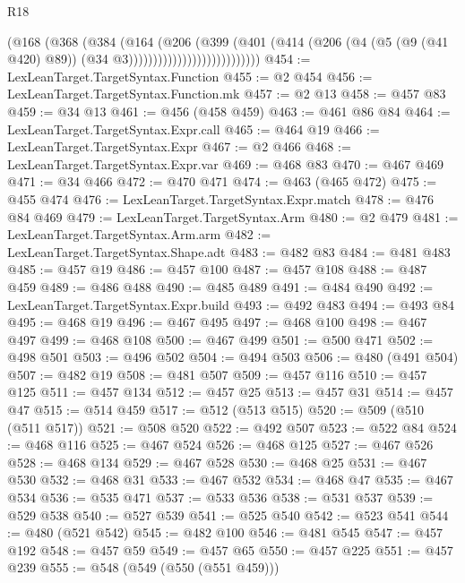 \begin{lexlean}{R18}
\begin{coremodule}
                                    (@168
                                      (@368
                                        (@384
                                          (@164
                                            (@206
                                              (@399
                                                (@401
                                                  (@414
                                                    (@206
                                                      (@4
                                                        (@5 (@9 (@41 @420) @89))
                                                        (@34 @3)))))))))))))))))))))))))))
@454 := LexLeanTarget.TargetSyntax.Function
@455 := @2 @454
@456 := LexLeanTarget.TargetSyntax.Function.mk
@457 := @2 @13
@458 := @457 @83
@459 := @34 @13
@461 := @456 (@458 @459)
@463 := @461 @86 @84
@464 := LexLeanTarget.TargetSyntax.Expr.call
@465 := @464 @19
@466 := LexLeanTarget.TargetSyntax.Expr
@467 := @2 @466
@468 := LexLeanTarget.TargetSyntax.Expr.var
@469 := @468 @83
@470 := @467 @469
@471 := @34 @466
@472 := @470 @471
@474 := @463 (@465 @472)
@475 := @455 @474
@476 := LexLeanTarget.TargetSyntax.Expr.match
@478 := @476 @84 @469
@479 := LexLeanTarget.TargetSyntax.Arm
@480 := @2 @479
@481 := LexLeanTarget.TargetSyntax.Arm.arm
@482 := LexLeanTarget.TargetSyntax.Shape.adt
@483 := @482 @83
@484 := @481 @483
@485 := @457 @19
@486 := @457 @100
@487 := @457 @108
@488 := @487 @459
@489 := @486 @488
@490 := @485 @489
@491 := @484 @490
@492 := LexLeanTarget.TargetSyntax.Expr.build
@493 := @492 @483
@494 := @493 @84
@495 := @468 @19
@496 := @467 @495
@497 := @468 @100
@498 := @467 @497
@499 := @468 @108
@500 := @467 @499
@501 := @500 @471
@502 := @498 @501
@503 := @496 @502
@504 := @494 @503
@506 := @480 (@491 @504)
@507 := @482 @19
@508 := @481 @507
@509 := @457 @116
@510 := @457 @125
@511 := @457 @134
@512 := @457 @25
@513 := @457 @31
@514 := @457 @47
@515 := @514 @459
@517 := @512 (@513 @515)
@520 := @509 (@510 (@511 @517))
@521 := @508 @520
@522 := @492 @507
@523 := @522 @84
@524 := @468 @116
@525 := @467 @524
@526 := @468 @125
@527 := @467 @526
@528 := @468 @134
@529 := @467 @528
@530 := @468 @25
@531 := @467 @530
@532 := @468 @31
@533 := @467 @532
@534 := @468 @47
@535 := @467 @534
@536 := @535 @471
@537 := @533 @536
@538 := @531 @537
@539 := @529 @538
@540 := @527 @539
@541 := @525 @540
@542 := @523 @541
@544 := @480 (@521 @542)
@545 := @482 @100
@546 := @481 @545
@547 := @457 @192
@548 := @457 @59
@549 := @457 @65
@550 := @457 @225
@551 := @457 @239
@555 := @548 (@549 (@550 (@551 @459)))

\end{coremodule}
\end{lexlean}
